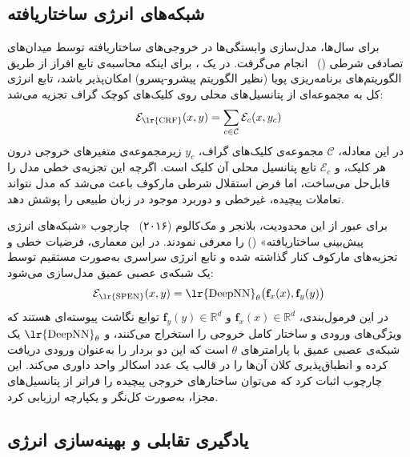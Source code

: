 \subsection{شبکه‌های انرژی ساختاریافته}\label{sec:2-4-3}

برای سال‌ها، مدل‌سازی وابستگی‌ها در خروجی‌های ساختاریافته توسط میدان‌های تصادفی شرطی ()~\cite{lafferty2001conditional} انجام می‌گرفت. در یک ، برای اینکه محاسبه‌ی تابع افراز از طریق الگوریتم‌های برنامه‌ریزی پویا (نظیر الگوریتم پیشرو-پسرو) امکان‌پذیر باشد، تابع انرژی کل به مجموعه‌ای از پتانسیل‌های محلی روی کلیک‌های کوچک گراف تجزیه می‌شد:
\begin{equation}\label{eq:chap2_crf_energy}
    \mathcal{E}_{\text{\lr{CRF}}}(x, y) = \sum_{c \in \mathcal{C}} \mathcal{E}_c(x, y_c)
\end{equation}
در این معادله، $\mathcal{C}$ مجموعه‌ی کلیک‌های گراف، $y_c$ زیرمجموعه‌ی متغیرهای خروجی درون هر کلیک، و $\mathcal{E}_c$ تابع پتانسیل محلی آن کلیک است. اگرچه این تجزیه‌ی خطی مدل را قابل‌حل می‌ساخت، اما فرض استقلال شرطی مارکوف باعث می‌شد که مدل نتواند تعاملات پیچیده، غیرخطی و دوربرد موجود در زبان طبیعی را پوشش دهد.

برای عبور از این محدودیت، بلانجر و مک‌کالوم (۲۰۱۶)~\cite{belanger2016spen} چارچوب «شبکه‌های انرژی پیش‌بینی ساختاریافته» () را معرفی نمودند. در این معماری، فرضیات خطی و تجزیه‌های مارکوف کنار گذاشته شده و تابع انرژی سراسری به‌صورت مستقیم توسط یک شبکه‌ی عصبی عمیق مدل‌سازی می‌شود:
\begin{equation}\label{eq:chap2_spen_energy}
    \mathcal{E}_{\text{\lr{SPEN}}}(x, y) = \text{\lr{DeepNN}}_\theta\big(\mathbf{f}_x(x), \mathbf{f}_y(y)\big)
\end{equation}
در این فرمول‌بندی، $\mathbf{f}_x(x) \in \mathbb{R}^d$ و $\mathbf{f}_y(y) \in \mathbb{R}^d$ توابع نگاشت پیوسته‌ای هستند که ویژگی‌های ورودی و ساختار کامل خروجی را استخراج می‌کنند، و $\text{\lr{DeepNN}}_\theta$ یک شبکه‌ی عصبی عمیق با پارامترهای $\theta$ است که این دو بردار را به‌عنوان ورودی دریافت کرده و انطباق‌پذیری کلان آن‌ها را در قالب یک عدد اسکالر واحد داوری می‌کند. این چارچوب اثبات کرد که می‌توان ساختارهای خروجی پیچیده را فراتر از پتانسیل‌های مجزا، به‌صورت کل‌نگر و یکپارچه ارزیابی کرد.


\subsection{یادگیری تقابلی و بهینه‌سازی انرژی}\label{sec:2-4-4}


